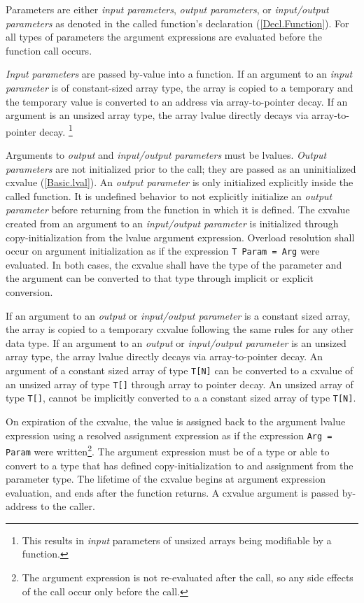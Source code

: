 \p Parameters are either \textit{input parameters}, \textit{output parameters},
or \textit{input/output parameters} as denoted in the called function's
declaration (\ref{Decl.Function}). For all types of parameters the argument
expressions are evaluated before the function call occurs.

\p \textit{Input parameters} are passed by-value into a function. If an argument
to an \textit{input parameter} is of constant-sized array type, the array is
copied to a temporary and the temporary value is converted to an address via
array-to-pointer decay. If an argument is an unsized array type, the array
lvalue directly decays via array-to-pointer decay. \footnote{This results in
\textit{input} parameters of unsized arrays being modifiable by a function.}

\p Arguments to \textit{output} and \textit{input/output parameters} must be
lvalues. \textit{Output parameters} are not initialized prior to the call; they
are passed as an uninitialized cxvalue (\ref{Basic.lval}). An \textit{output
parameter} is only initialized explicitly inside the called function. It is
undefined behavior to not explicitly initialize an \textit{output parameter}
before returning from the function in which it is defined. The cxvalue created
from an argument to an \textit{input/output parameter} is initialized through
copy-initialization from the lvalue argument expression. Overload resolution
shall occur on argument initialization as if the expression \texttt{T Param =
Arg} were evaluated. In both cases, the cxvalue shall have the type of the
parameter and the argument can be converted to that type through implicit or
explicit conversion.

\p If an argument to an \textit{output} or \textit{input/output parameter} is a
constant sized array, the array is copied to a temporary cxvalue following the
same rules for any other data type. If an argument to an \textit{output} or
\textit{input/output parameter} is an unsized array type, the array lvalue
directly decays via array-to-pointer decay. An argument of a constant sized
array of type \texttt{T[N]} can be converted to a cxvalue of an unsized array
of type \texttt{T[]} through array to pointer decay. An unsized array of type
\texttt{T[]}, cannot be implicitly converted to a a constant sized array of type
\texttt{T[N]}.

\p On expiration of the cxvalue, the value is assigned back to the argument
lvalue expression using a resolved assignment expression as if the expression
\texttt{Arg = Param} were written\footnote{The argument expression is not
re-evaluated after the call, so any side effects of the call occur only before
the call.}. The argument expression must be of a type or able to convert to a
type that has defined copy-initialization to and assignment from the parameter
type. The lifetime of the cxvalue begins at argument expression evaluation, and
ends after the function returns. A cxvalue argument is passed by-address to the
caller.

